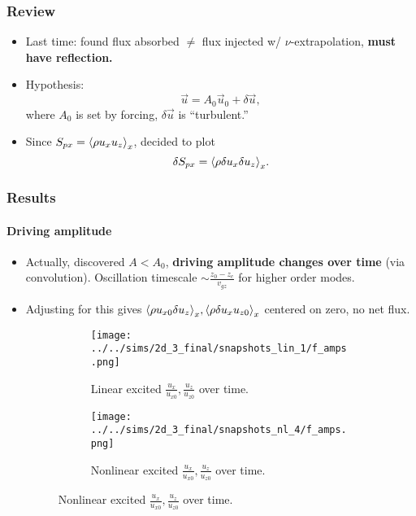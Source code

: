\documentclass[dvipsnames]{beamer}
\DeclarePairedDelimiter\ev{\langle}{\rangle}
\begin{document}
\begin{frame}
    \frametitle{Review}

    \begin{itemize}
        \item Last time: found flux absorbed $\neq$ flux injected w/
            $\nu$-extrapolation, \textbf{must have reflection.}

        \item Hypothesis:
            \begin{equation}
                \vec{u} = A_0\vec{u}_0 + \delta \vec{u},
            \end{equation}
            where $A_0$ is set by forcing, $\delta \vec{u}$ is ``turbulent.''

        \item Since $S_{px} = \ev*{\rho u_xu_z}_x$, decided to plot
            \begin{equation}
                \delta S_{px} = \ev*{\rho \delta u_x \delta u_z}_x.
            \end{equation}
    \end{itemize}
\end{frame}

\begin{frame}
    \frametitle{Results}
    \framesubtitle{Driving amplitude}

    \begin{itemize}
        \item Actually, discovered $A < A_0$, \textbf{driving amplitude changes
            over time} (via convolution). Oscillation timescale $\sim
            \frac{z_0 - z_c}{v_{gz}}$ for higher order modes.

        \item Adjusting for this gives $\ev*{\rho u_{x0} \delta u_z}_x,
            \ev*{\rho \delta u_x u_{z0}}_x$ centered on zero, no net flux.

        \begin{figure}[t]
            \centering
            \begin{subfigure}{0.45\textwidth}
                \centering
                \texttt{[image: ../../sims/2d\_3\_final/snapshots\_lin\_1/f\_amps.png]}
                \caption{Linear excited $\frac{u_x}{u_{x0}}, \frac{u_z}{u_{z0}}$ over
                time.}
            \end{subfigure}
            \begin{subfigure}{0.45\textwidth}
                \centering
                \texttt{[image: ../../sims/2d\_3\_final/snapshots\_nl\_4/f\_amps.png]}
                \caption{Nonlinear excited $\frac{u_x}{u_{x0}}, \frac{u_z}{u_{z0}}$ over
                time.}
            \end{subfigure}
        \end{figure}
    \end{itemize}
\end{frame}
\end{document}
